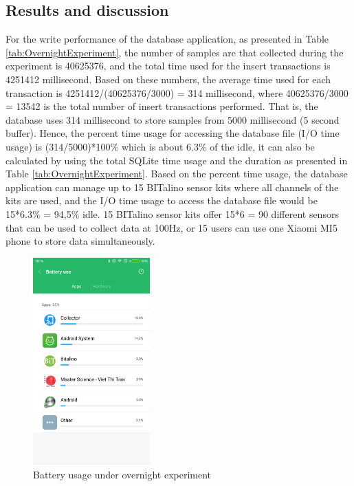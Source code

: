\subsection{Results and discussion}
For the write performance of the database application, as presented in Table \ref{tab:OvernightExperiment}, the number of samples are that collected during the experiment is 40625376, and the total time used for the insert transactions is 4251412 millisecond. Based on these numbers, the average time used for each transaction is 4251412/(40625376/3000) = 314 millisecond, where 40625376/3000 = 13542 is the total number of insert transactions performed. That is, the database uses 314 millisecond to store samples from 5000 millisecond (5 second buffer). Hence, the percent time usage for accessing the database file (I/O time usage) is (314/5000)*100\% which is about 6.3\% of the idle, it can also be calculated by using the total SQLite time usage and the duration as presented in Table \ref{tab:OvernightExperiment}. Based on the percent time usage, the database application can manage up to 15 BITalino sensor kits where all channels of the kits are used, and the I/O time usage to access the database file would be 15*6.3\% = 94,5\% idle. 15 BITalino sensor kits offer 15*6 = 90 different sensors that can be used to collect data at 100Hz, or 15 users can use one Xiaomi MI5 phone to store data simultaneously.\\
\begin{figure}
    \centering
    \includegraphics[width=0.4\textwidth]{Figures/PowerMetric.png}
    \caption{Battery usage under overnight experiment}
    \label{fig:Figures/PowerMetric}
\end{figure}
